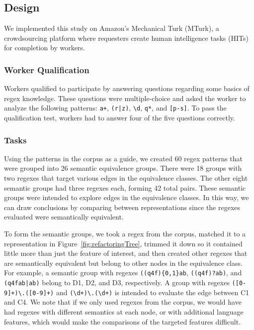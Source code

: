 \subsection{Design}
We implemented this study on Amazon's Mechanical Turk (MTurk), a crowdsourcing platform where requesters create human intelligence tasks (HITs) for completion by workers.

\subsubsection{Worker Qualification}
Workers qualified to participate by answering questions regarding some basics of regex knowledge. These questions were multiple-choice and asked the worker to analyze the following patterns: \verb!a+!, \verb!(r|z)!, \verb!\d!, \verb!q*!, and \verb![p-s]!. To pass the qualification test, workers had to answer four of the five questions correctly.

\subsubsection{Tasks}
Using the patterns in the corpus as a guide, we created 60 regex patterns that were grouped into 26 semantic equivalence groups.
 There were 18 groups with two regexes that target various edges in the equivalence classes.
The other eight semantic groups had three regexes each, forming 42 total pairs.
These semantic groups were intended to explore edges in the equivalence classes. In this way, we can draw conclusions by comparing between representations since the regexes evaluated were semantically equivalent.

To form the semantic groups, we took a regex from the corpus, matched it to a representation in Figure~\ref{fig:refactoringTree}, trimmed it down so it contained little more than just the feature of interest, and then created other regexes that are semantically equivalent but belong to other nodes in the equivalence class. For example, a semantic group with regexes \verb!((q4f){0,1}ab!, \verb!((q4f)?ab)!, and \verb!(q4fab|ab)! belong to D1, D2, and D3, respectively.
A group with regexes \verb!([0-9]+)\.([0-9]+)! and \verb!(\d+)\.(\d+)! is intended to evaluate the edge between C1 and C4.
We note that if we only used regexes from the corpus, we would have had regexes with different semantics at each node, or with additional language features, which would make the comparisons of the targeted features difficult.




